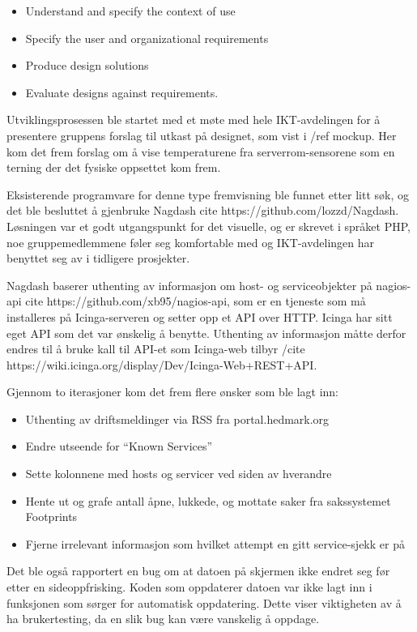 \begin{itemize}
	\item Understand and specify the context of use
	\item Specify the user and organizational requirements
	\item Produce design solutions
	\item Evaluate designs against requirements.
\end{itemize}

Utviklingsprosessen ble startet med et møte med hele IKT-avdelingen for å presentere gruppens forslag til utkast på designet, som vist i  /ref mockup. Her kom det frem forslag om å vise temperaturene fra serverrom-sensorene som en terning der det fysiske oppsettet kom frem.

Eksisterende programvare for denne type fremvisning ble funnet etter litt søk, og det ble besluttet å gjenbruke Nagdash cite https://github.com/lozzd/Nagdash. Løsningen var et godt utgangspunkt for det visuelle, og er skrevet i språket PHP, noe gruppemedlemmene føler seg komfortable med og IKT-avdelingen har benyttet seg av i tidligere prosjekter. 

Nagdash baserer uthenting av informasjon om host- og serviceobjekter på nagios-api cite https://github.com/xb95/nagios-api, som er en tjeneste som må installeres på Icinga-serveren og setter opp et API over HTTP. Icinga har sitt eget API som det var ønskelig å benytte. Uthenting av informasjon måtte derfor endres til å bruke kall til API-et som Icinga-web tilbyr /cite https://wiki.icinga.org/display/Dev/Icinga-Web+REST+API.

Gjennom to iterasjoner kom det frem flere ønsker som ble lagt inn:
\begin{itemize}
	 \item Uthenting av driftsmeldinger via RSS fra portal.hedmark.org
	 \item Endre utseende for “Known Services”
	 \item Sette kolonnene med hosts og servicer ved siden av hverandre 
	 \item Hente ut og grafe antall åpne, lukkede, og mottate saker fra sakssystemet Footprints
	 \item Fjerne irrelevant informasjon som hvilket attempt en gitt service-sjekk er på
\end{itemize}

Det ble også rapportert en bug om at datoen på skjermen ikke endret seg før etter en sideoppfrisking. Koden som oppdaterer datoen var ikke lagt inn i funksjonen som sørger for automatisk oppdatering. Dette viser viktigheten av å ha brukertesting, da en slik bug kan være vanskelig å oppdage.

